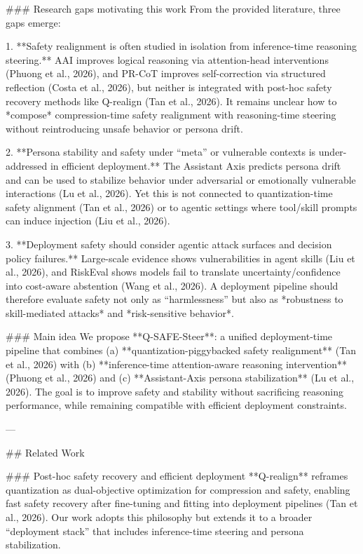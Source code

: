 ### Research gaps motivating this work  
From the provided literature, three gaps emerge:

1. **Safety realignment is often studied in isolation from inference-time reasoning steering.**  
   AAI improves logical reasoning via attention-head interventions (Phuong et al., 2026), and PR-CoT improves self-correction via structured reflection (Costa et al., 2026), but neither is integrated with post-hoc safety recovery methods like Q-realign (Tan et al., 2026). It remains unclear how to *compose* compression-time safety realignment with reasoning-time steering without reintroducing unsafe behavior or persona drift.

2. **Persona stability and safety under “meta” or vulnerable contexts is under-addressed in efficient deployment.**  
   The Assistant Axis predicts persona drift and can be used to stabilize behavior under adversarial or emotionally vulnerable interactions (Lu et al., 2026). Yet this is not connected to quantization-time safety alignment (Tan et al., 2026) or to agentic settings where tool/skill prompts can induce injection (Liu et al., 2026).

3. **Deployment safety should consider agentic attack surfaces and decision policy failures.**  
   Large-scale evidence shows vulnerabilities in agent skills (Liu et al., 2026), and RiskEval shows models fail to translate uncertainty/confidence into cost-aware abstention (Wang et al., 2026). A deployment pipeline should therefore evaluate safety not only as “harmlessness” but also as *robustness to skill-mediated attacks* and *risk-sensitive behavior*.

### Main idea  
We propose **Q-SAFE-Steer**: a unified deployment-time pipeline that combines (a) **quantization-piggybacked safety realignment** (Tan et al., 2026) with (b) **inference-time attention-aware reasoning intervention** (Phuong et al., 2026) and (c) **Assistant-Axis persona stabilization** (Lu et al., 2026). The goal is to improve safety and stability without sacrificing reasoning performance, while remaining compatible with efficient deployment constraints.

---

## Related Work  

### Post-hoc safety recovery and efficient deployment  
**Q-realign** reframes quantization as dual-objective optimization for compression and safety, enabling fast safety recovery after fine-tuning and fitting into deployment pipelines (Tan et al., 2026). Our work adopts this philosophy but extends it to a broader “deployment stack” that includes inference-time steering and persona stabilization.


